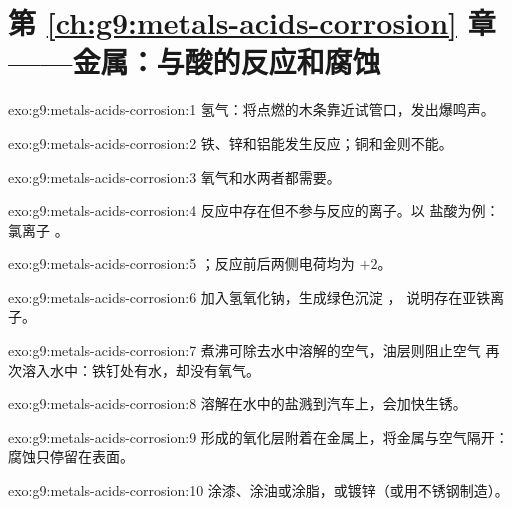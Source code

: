 \section*{第 \ref{ch:g9:metals-acids-corrosion} 章——金属：与酸的反应和腐蚀}

\begin{solution}{exo:g9:metals-acids-corrosion:1}
氢气：将点燃的木条靠近试管口，发出爆鸣声。
\end{solution}

\begin{solution}{exo:g9:metals-acids-corrosion:2}
铁、锌和铝能发生反应；铜和金则不能。
\end{solution}

\begin{solution}{exo:g9:metals-acids-corrosion:3}
氧气和水两者都需要。
\end{solution}

\begin{solution}{exo:g9:metals-acids-corrosion:4}
反应中存在但不参与反应的离子。以
盐酸为例：氯离子 。
\end{solution}

\begin{solution}{exo:g9:metals-acids-corrosion:5}
；反应前后两侧电荷均为 $+2$。
\end{solution}

\begin{solution}{exo:g9:metals-acids-corrosion:6}
加入氢氧化钠，生成绿色沉淀 ，
说明存在亚铁离子。
\end{solution}

\begin{solution}{exo:g9:metals-acids-corrosion:7}
煮沸可除去水中溶解的空气，油层则阻止空气
再次溶入水中：铁钉处有水，却没有氧气。
\end{solution}

\begin{solution}{exo:g9:metals-acids-corrosion:8}
溶解在水中的盐溅到汽车上，会加快生锈。
\end{solution}

\begin{solution}{exo:g9:metals-acids-corrosion:9}
形成的氧化层附着在金属上，将金属与空气隔开：
腐蚀只停留在表面。
\end{solution}

\begin{solution}{exo:g9:metals-acids-corrosion:10}
涂漆、涂油或涂脂，或镀锌（或用不锈钢制造）。
\end{solution}

